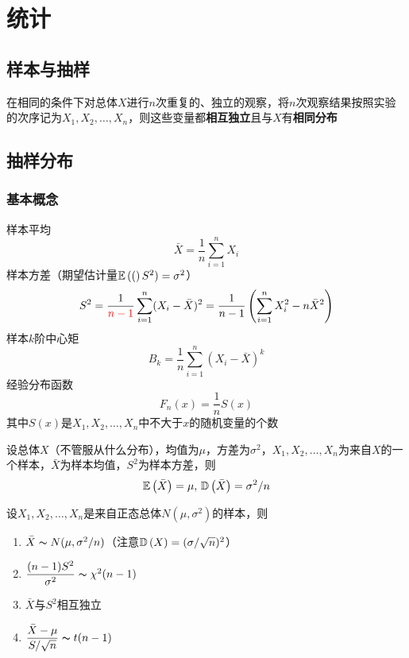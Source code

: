 
\section{统计}
\subsection{样本与抽样}
\begin{definition}[简单随机样本]
在相同的条件下对总体$X$进行$n$次重复的、独立的观察，将$n$次观察结果按照实验的次序记为$X_1,X_2,\ldots,X_n$，则这些变量都\textbf{相互独立}且与$X$有\textbf{相同分布}
\end{definition}

\subsection{抽样分布}
\subsubsection{基本概念}
\begin{definition}[统计量]
样本平均
\[\bar{X}=\frac{1}{n}\sum_{i=1}^nX_i\]
样本方差（期望估计量$\mathbb{E}\left((\right)S^2)=\sigma^2$）
\[S^2=\frac{1}{\textcolor{red}{n-1}}\sum_{i=1}^n(X_i-\bar{X})^2=\frac{1}{n-1}\left(\sum_{i=1}^nX_i^2-n\bar{X}^2\right)\]
样本$k$阶中心矩
\[B_k=\frac{1}{n}\sum_{i=1}^n(X_i-\bar{X})^k\]
经验分布函数
\[F_n(x)=\frac{1}{n}S(x)\]
其中$S(x)$是$X_1,X_2,\ldots,X_n$中不大于$x$的随机变量的个数
\end{definition}
\begin{theorem}
设总体$X$（不管服从什么分布），均值为$\mu$，方差为$\sigma^2$，$X_1,X_2,\ldots,X_n$为来自$X$的一个样本，$\bar{X}$为样本均值，$S^2$为样本方差，则
\[\mathbb{E}\left(\bar{X}\right)=\mu,\,\mathbb{D}\left(\bar{X}\right)=\sigma^2/n\]
\end{theorem}
\begin{theorem}
设$X_1,X_2,\ldots,X_n$是来自正态总体$N(\mu,\sigma^2)$的样本，则
\begin{enumerate}
	\item $\bar{X}\thicksim N(\mu,\sigma^2/n)$（注意$\mathbb{D}\left(X\right)=(\sigma/\sqrt{n})^2$）
	\item $\dfrac{(n-1)S^2}{\sigma^2}\thicksim \chi^2(n-1)$
	\item $\bar{X}$与$S^2$相互独立
	\item $\dfrac{\bar{X}-\mu}{S/\sqrt{n}}\thicksim t(n-1)$
\end{enumerate}
\end{theorem}

